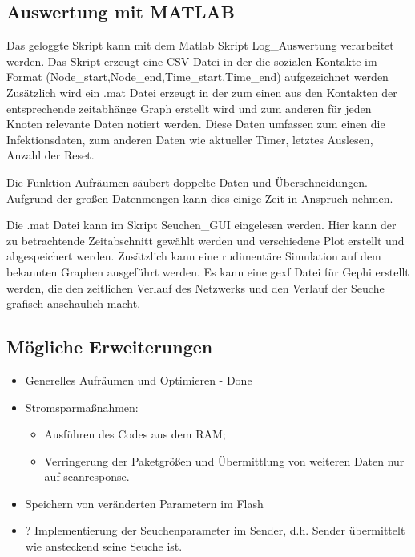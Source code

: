 \documentclass[11pt,ngerman]{scrartcl} %
\begin{document}
\subsection{Auswertung mit MATLAB}

Das geloggte Skript kann mit dem Matlab Skript Log\_Auswertung verarbeitet werden. Das Skript erzeugt eine CSV-Datei in der die sozialen Kontakte im Format (Node\_start,Node\_end,Time\_start,Time\_end)  aufgezeichnet werden
Zusätzlich wird ein .mat Datei erzeugt in der zum einen aus den Kontakten der entsprechende zeitabhänge Graph erstellt wird und zum anderen für jeden Knoten relevante Daten notiert werden. Diese Daten umfassen zum einen die Infektionsdaten, zum anderen Daten wie aktueller Timer, letztes Auslesen, Anzahl der Reset. 

Die Funktion Aufräumen säubert doppelte Daten und Überschneidungen. Aufgrund der großen Datenmengen kann dies einige Zeit in Anspruch nehmen.

Die .mat Datei kann im Skript Seuchen\_GUI eingelesen werden. Hier kann der zu betrachtende Zeitabschnitt gewählt werden und verschiedene Plot erstellt und abgespeichert werden. Zusätzlich kann eine rudimentäre Simulation auf dem bekannten Graphen ausgeführt werden.
Es kann eine gexf Datei für Gephi erstellt werden, die den zeitlichen Verlauf des Netzwerks und den Verlauf der Seuche grafisch anschaulich macht.


\subsection{Mögliche Erweiterungen}
\begin{itemize}
\item  Generelles Aufräumen und Optimieren - Done
\item  Stromsparmaßnahmen: 
\begin{itemize}
\item 	Ausführen des Codes aus dem RAM; 
\item Verringerung der Paketgrößen und Übermittlung von weiteren Daten nur auf scanresponse. 
\end{itemize} 
\item  Speichern von veränderten Parametern im Flash
\item  ? Implementierung der Seuchenparameter im Sender, d.h. Sender übermittelt wie ansteckend seine Seuche ist.
\end{itemize}
\end{document}

